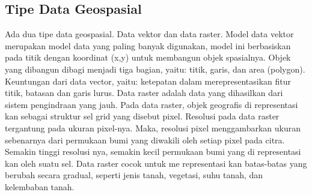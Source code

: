 \subsection{Tipe Data Geospasial}
Ada dua tipe data geospasial. Data vektor dan data raster. Model data vektor merupakan model data yang paling banyak digunakan, model ini berbasiskan pada titik dengan koordinat (x,y) untuk membangun objek spasialnya. Objek yang dibangun
dibagi menjadi tiga bagian, yaitu: titik, garis, dan area (polygon).
Keuntungan dari data vector, yaitu: ketepatan dalam merepresentasikan fitur titik, batasan dan
garis lurus. Data raster adalah data yang dihasilkan dari sistem pengindraan yang jauh. Pada data raster,
objek geografis di representasi kan sebagai struktur sel grid yang disebut pixel. Resolusi pada data
raster tergantung pada ukuran pixel-nya.
Maka, resolusi pixel menggambarkan ukuran sebenarnya dari permukaan bumi yang diwakili
oleh setiap pixel pada citra. Semakin tinggi resolusi nya, semakin kecil permukaan bumi yang
di representasi kan oleh suatu sel. Data raster cocok untuk me representasi kan batas-batas yang
berubah secara gradual, seperti jenis tanah, vegetasi, suhu tanah, dan kelembaban tanah.


